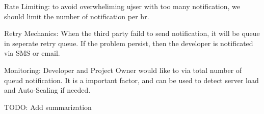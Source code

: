 Rate Limiting: to avoid overwheliming ujser with too many notification, we should limit the number of notification per hr. 

Retry Mechanics: When the third party faild to send notification, it will be queue in seperate retry queue. If the problem persist, then the developer is notificated via SMS or email.

Monitoring: Developer and Project Owner would like to via total number of queud notification. It is a important factor, and can be used to detect server load and Auto-Scaling if needed.

TODO: Add summarization 